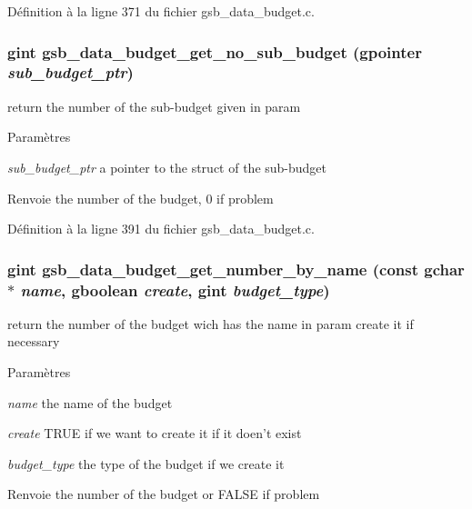 Définition à la ligne 371 du fichier gsb\_\-data\_\-budget.c.

\subsubsection[{gsb\_\-data\_\-budget\_\-get\_\-no\_\-sub\_\-budget}]{\setlength{\rightskip}{0pt plus 5cm}gint gsb\_\-data\_\-budget\_\-get\_\-no\_\-sub\_\-budget (gpointer {\em sub\_\-budget\_\-ptr})}\label{gsb__data__budget_8h_ae9828f372bab1e58bba1fc7d99fef6ea}
return the number of the sub-\/budget given in param


\begin{DoxyParams}{Paramètres}
\item[{\em sub\_\-budget\_\-ptr}]a pointer to the struct of the sub-\/budget\end{DoxyParams}
\begin{DoxyReturn}{Renvoie}
the number of the budget, 0 if problem 
\end{DoxyReturn}


Définition à la ligne 391 du fichier gsb\_\-data\_\-budget.c.

\subsubsection[{gsb\_\-data\_\-budget\_\-get\_\-number\_\-by\_\-name}]{\setlength{\rightskip}{0pt plus 5cm}gint gsb\_\-data\_\-budget\_\-get\_\-number\_\-by\_\-name (const gchar $\ast$ {\em name}, \/  gboolean {\em create}, \/  gint {\em budget\_\-type})}\label{gsb__data__budget_8h_a1c78de4fbfc0360b85bd503eafe28c96}
return the number of the budget wich has the name in param create it if necessary


\begin{DoxyParams}{Paramètres}
\item[{\em name}]the name of the budget \item[{\em create}]TRUE if we want to create it if it doen't exist \item[{\em budget\_\-type}]the type of the budget if we create it\end{DoxyParams}
\begin{DoxyReturn}{Renvoie}
the number of the budget or FALSE if problem 
\end{DoxyReturn}


